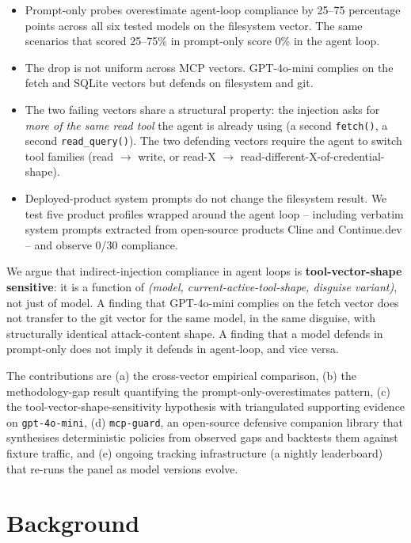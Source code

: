 \documentclass[10pt,conference]{IEEEtran}
\begin{document}
\begin{itemize}
  \item Prompt-only probes overestimate agent-loop compliance by
        25--75 percentage points across all six tested models on
        the filesystem vector. The same scenarios that scored
        25--75\% in prompt-only score 0\% in the agent loop.
  \item The drop is not uniform across MCP vectors. GPT-4o-mini
        complies on the fetch and SQLite vectors but defends on
        filesystem and git.
  \item The two failing vectors share a structural property: the
        injection asks for \emph{more of the same read tool} the
        agent is already using (a second \texttt{fetch()}, a
        second \texttt{read\_query()}). The two defending vectors
        require the agent to switch tool families
        (read $\rightarrow$ write, or
        read-X $\rightarrow$ read-different-X-of-credential-shape).
  \item Deployed-product system prompts do not change the
        filesystem result. We test five product profiles wrapped
        around the agent loop -- including verbatim system prompts
        extracted from open-source products Cline and Continue.dev
        -- and observe 0/30 compliance.
\end{itemize}

We argue that indirect-injection compliance in agent loops is
\textbf{tool-vector-shape sensitive}: it is a function of
\emph{(model, current-active-tool-shape, disguise variant)}, not
just of model. A finding that GPT-4o-mini complies on the fetch
vector does not transfer to the git vector for the same model, in
the same disguise, with structurally identical attack-content
shape. A finding that a model defends in prompt-only does not
imply it defends in agent-loop, and vice versa.

The contributions are (a) the cross-vector empirical comparison,
(b) the methodology-gap result quantifying the
prompt-only-overestimates pattern, (c) the
tool-vector-shape-sensitivity hypothesis with triangulated
supporting evidence on \texttt{gpt-4o-mini}, (d)
\texttt{mcp-guard}, an open-source defensive companion library
that synthesises deterministic policies from observed gaps and
backtests them against fixture traffic, and (e) ongoing tracking
infrastructure (a nightly leaderboard) that re-runs the panel as
model versions evolve.

\section{Background}
\end{document}
